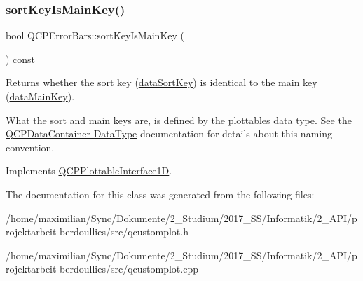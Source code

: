 \subsubsection{\texorpdfstring{sort\+Key\+Is\+Main\+Key()}{sortKeyIsMainKey()}}
{\footnotesize\ttfamily bool Q\+C\+P\+Error\+Bars\+::sort\+Key\+Is\+Main\+Key (\begin{DoxyParamCaption}{ }\end{DoxyParamCaption}) const\hspace{0.3cm}{\ttfamily [virtual]}}

Returns whether the sort key (\hyperlink{class_q_c_p_error_bars_a1ef91328ad7dde84695958139d5f40cf}{data\+Sort\+Key}) is identical to the main key (\hyperlink{class_q_c_p_error_bars_ae3931213f76cd34a824c42c22a1dca74}{data\+Main\+Key}).

What the sort and main keys are, is defined by the plottable\textquotesingle{}s data type. See the \hyperlink{class_q_c_p_data_container_qcpdatacontainer-datatype}{Q\+C\+P\+Data\+Container Data\+Type} documentation for details about this naming convention. 

Implements \hyperlink{class_q_c_p_plottable_interface1_d_a229e65e7ab968dd6cd0e259fa504b79d}{Q\+C\+P\+Plottable\+Interface1D}.



The documentation for this class was generated from the following files\+:\begin{DoxyCompactItemize}
\item 
/home/maximilian/\+Sync/\+Dokumente/2\+\_\+\+Studium/2017\+\_\+\+S\+S/\+Informatik/2\+\_\+\+A\+P\+I/projektarbeit-\/berdoullies/src/qcustomplot.\+h\item 
/home/maximilian/\+Sync/\+Dokumente/2\+\_\+\+Studium/2017\+\_\+\+S\+S/\+Informatik/2\+\_\+\+A\+P\+I/projektarbeit-\/berdoullies/src/qcustomplot.\+cpp\end{DoxyCompactItemize}
